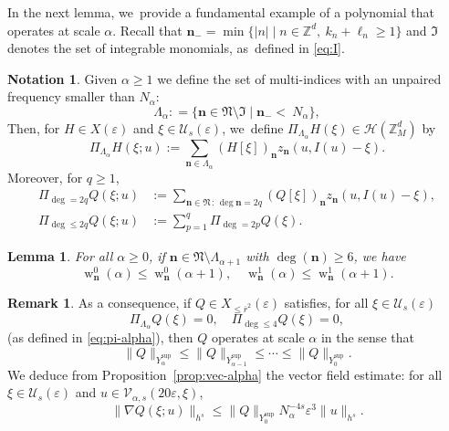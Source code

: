 \documentclass[10pt,a4paper]{amsart}
\theoremstyle{plain}
\newtheorem{lemma}[theorem]{Lemma}
\theoremstyle{definition}
\newtheorem{notation}[theorem]{Notation}
\newtheorem{remark}[theorem]{Remark}
\newcommand{\nb}{{\boldsymbol n}}
\newcommand{\Nb}{{\boldsymbol{\mathfrak{N}}}}
\newcommand{\Z}{\mathbb{Z}}
\newcommand{\1}{\mathbf{1}}
\newcommand{\Ysup}[1]{Y_{#1}^{\mathrm{sup}}}
\let\epsilon\varepsilon
\begin{document}
In the next lemma, we~provide a fundamental example of a polynomial that operates at scale $\alpha$. Recall that $\nb_{-}=\min\{|n|\mid n\in\Z^{d},\ k_{n}+\ell_{n}\geq1\}$ and $\mathfrak{I}$ denotes the set of integrable monomials, as~defined in \eqref{eq:I}.

\begin{notation}
Given $\alpha\geq1$ we define the set of multi-indices with an unpaired frequency smaller than $N_{\alpha}$:
\begin{equation}
\label{eq:scale}
\Lambda_\alpha : = \{\nb\in\Nb\setminus\mathfrak{I}\mid\nb_{-} <\ N_\alpha\},
\end{equation}
Then, for $H\in X(\epsilon)$ and $\xi\in\mathcal{U}_{s}(\epsilon)$, we~define $\Pi_{\Lambda_{\alpha}}H(\xi)\in\mathcal{H}(\Z_{M}^{d})$ by
\begin{equation}
\label{eq:pi-alpha}
\Pi_{\Lambda_{\alpha}}H(\xi;u)
:= \sum_{\nb\in\Lambda_{\alpha}}(H[\xi])_{\nb}z_{\nb}(u,I(u)-\xi).
\end{equation}
Moreover, for $q\geq1$,
\begin{align*}
\Pi_{\deg=2q}Q(\xi;u) &:= \sum_{\nb\in\Nb\,:\, \deg{\nb}=2q}(Q[\xi])_{\nb} z_{\nb}(u,I(u)-\xi),\\
\Pi_{\deg\leq2q}Q(\xi;u) &:= \sum_{p=1}^{q}\Pi_{\deg=2p}Q(\xi).
\end{align*}
\end{notation}

\begin{lemma}\label{lem:scale}
For all $\alpha\geq0$, if $\nb\in\Nb\setminus\Lambda_{\alpha+1}$ with $\deg(\nb)\geq6$, we have
\[
\operatorname{w}_{\nb}^{0}(\alpha) \leq \operatorname{w}_{\nb}^{0}(\alpha+1),\quad \operatorname{w}_{\nb}^{1}(\alpha) \leq \operatorname{w}_{\nb}^{1}(\alpha+1).
\]
\end{lemma}

\begin{remark}\label{rem:scale} As a consequence, if $Q\in X_{\leq\overline{r}^{2}}(\epsilon)$ satisfies, for all $\xi\in\mathcal{U}_{s}(\epsilon)$
\[
\Pi_{\Lambda_{\alpha}}Q(\xi) = 0,\quad \Pi_{\deg\leq4}Q(\xi)=0,
\]
(as defined in \eqref{eq:pi-alpha}), then $Q$ operates at scale $\alpha$ in the sense that
\[
\|Q\|_{\Ysup{\alpha}}\leq \|Q\|_{\Ysup{\alpha-1}} \leq \cdots \leq \|Q\|_{\Ysup{0}}.
\]
We deduce from Proposition~\ref{prop:vec-alpha} the vector field estimate: for all $\xi\in\mathcal{U}_{s}(\epsilon)$ and $u\in\mathcal{V}_{\alpha,s}(20\epsilon,\xi)$,
\[
\|\nabla Q(\xi;u)\|_{h^{s}} \leq \|Q\|_{\Ysup{0}}N_{\alpha}^{-4s}\epsilon^{3}\|u\|_{h^{s}}.
\]
\end{remark}
\end{document}
